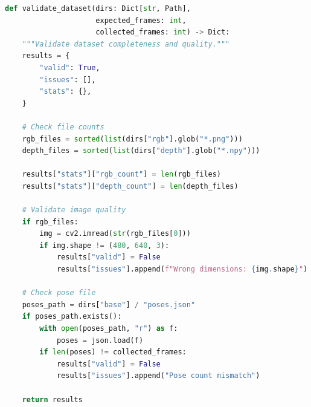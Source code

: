 \begin{lstlisting}[language=Python, caption={Dataset Validation Function}]
def validate_dataset(dirs: Dict[str, Path],
                     expected_frames: int,
                     collected_frames: int) -> Dict:
    """Validate dataset completeness and quality."""
    results = {
        "valid": True,
        "issues": [],
        "stats": {},
    }

    # Check file counts
    rgb_files = sorted(list(dirs["rgb"].glob("*.png")))
    depth_files = sorted(list(dirs["depth"].glob("*.npy")))

    results["stats"]["rgb_count"] = len(rgb_files)
    results["stats"]["depth_count"] = len(depth_files)

    # Validate image quality
    if rgb_files:
        img = cv2.imread(str(rgb_files[0]))
        if img.shape != (480, 640, 3):
            results["valid"] = False
            results["issues"].append(f"Wrong dimensions: {img.shape}")

    # Check pose file
    poses_path = dirs["base"] / "poses.json"
    if poses_path.exists():
        with open(poses_path, "r") as f:
            poses = json.load(f)
        if len(poses) != collected_frames:
            results["valid"] = False
            results["issues"].append("Pose count mismatch")

    return results
\end{lstlisting}
